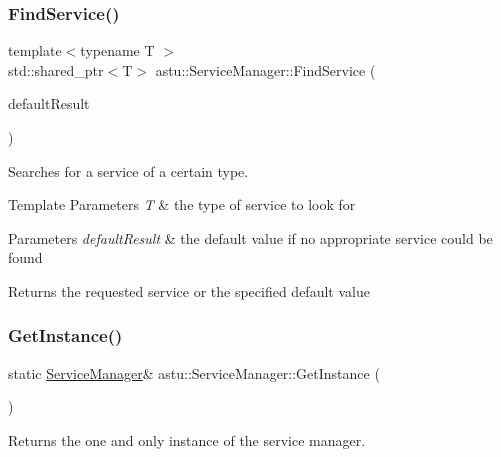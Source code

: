 \subsubsection{\texorpdfstring{Find\+Service()}{FindService()}\hspace{0.1cm}{\footnotesize\ttfamily [2/2]}}
{\footnotesize\ttfamily template$<$typename T $>$ \\
std\+::shared\+\_\+ptr$<$T$>$ astu\+::\+Service\+Manager\+::\+Find\+Service (\begin{DoxyParamCaption}\item[{std\+::shared\+\_\+ptr$<$ T $>$}]{default\+Result }\end{DoxyParamCaption})\hspace{0.3cm}{\ttfamily [inline]}}

Searches for a service of a certain type.


\begin{DoxyTemplParams}{Template Parameters}
{\em T} & the type of service to look for \\
\hline
\end{DoxyTemplParams}

\begin{DoxyParams}{Parameters}
{\em default\+Result} & the default value if no appropriate service could be found \\
\hline
\end{DoxyParams}
\begin{DoxyReturn}{Returns}
the requested service or the specified default value 
\end{DoxyReturn}
\mbox{\label{classastu_1_1ServiceManager_a26941fe98ea3f2792deca62e4124bf15}} 
\subsubsection{\texorpdfstring{Get\+Instance()}{GetInstance()}}
{\footnotesize\ttfamily static \hyperlink{classastu_1_1ServiceManager}{Service\+Manager}\& astu\+::\+Service\+Manager\+::\+Get\+Instance (\begin{DoxyParamCaption}{ }\end{DoxyParamCaption})\hspace{0.3cm}{\ttfamily [static]}}

Returns the one and only instance of the service manager.

